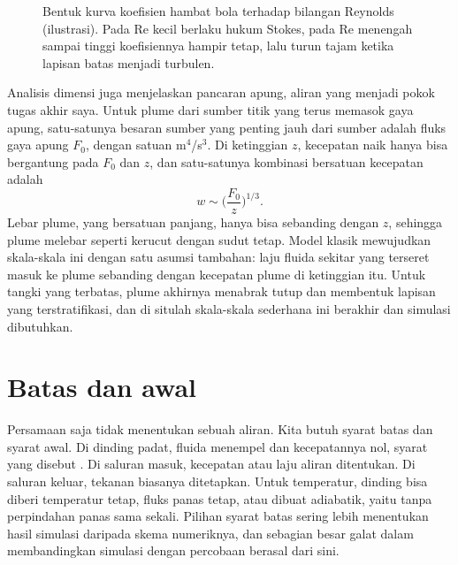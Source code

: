 \begin{figure}[ht]
\centering
{}
\caption{Bentuk kurva koefisien hambat bola terhadap bilangan Reynolds (ilustrasi). Pada Re kecil berlaku hukum Stokes, pada
Re menengah sampai tinggi koefisiennya hampir tetap, lalu turun tajam ketika lapisan batas menjadi turbulen.}
\label{fig:cd}
\end{figure}

Analisis dimensi juga menjelaskan pancaran apung, aliran yang menjadi pokok tugas akhir saya. Untuk plume dari sumber titik
yang terus memasok gaya apung, satu-satunya besaran sumber yang penting jauh dari sumber adalah fluks gaya apung $F_0$,
dengan satuan m$^4$/s$^3$. Di ketinggian $z$, kecepatan naik hanya bisa bergantung pada $F_0$ dan $z$, dan satu-satunya
kombinasi bersatuan kecepatan adalah
\begin{equation}
w\sim\Big(\frac{F_0}{z}\Big)^{1/3}.
\end{equation}
Lebar plume, yang bersatuan panjang, hanya bisa sebanding dengan $z$, sehingga plume melebar seperti kerucut dengan sudut
tetap. Model klasik \citet{morton1956} mewujudkan skala-skala ini dengan satu asumsi tambahan: laju fluida sekitar yang
terseret masuk ke plume sebanding dengan kecepatan plume di ketinggian itu. Untuk tangki yang terbatas, plume akhirnya
menabrak tutup dan membentuk lapisan yang terstratifikasi, dan di situlah skala-skala sederhana ini berakhir dan simulasi
dibutuhkan.

\section{Batas dan awal}

Persamaan saja tidak menentukan sebuah aliran. Kita butuh syarat batas dan syarat awal. Di dinding
padat, fluida menempel dan kecepatannya nol, syarat yang disebut . Di saluran masuk,
kecepatan atau laju aliran ditentukan. Di saluran keluar, tekanan biasanya ditetapkan. Untuk
temperatur, dinding bisa diberi temperatur tetap, fluks panas tetap, atau dibuat adiabatik, yaitu
tanpa perpindahan panas sama sekali. Pilihan syarat batas sering lebih menentukan hasil simulasi
daripada skema numeriknya, dan sebagian besar galat dalam membandingkan simulasi dengan percobaan
berasal dari sini.

